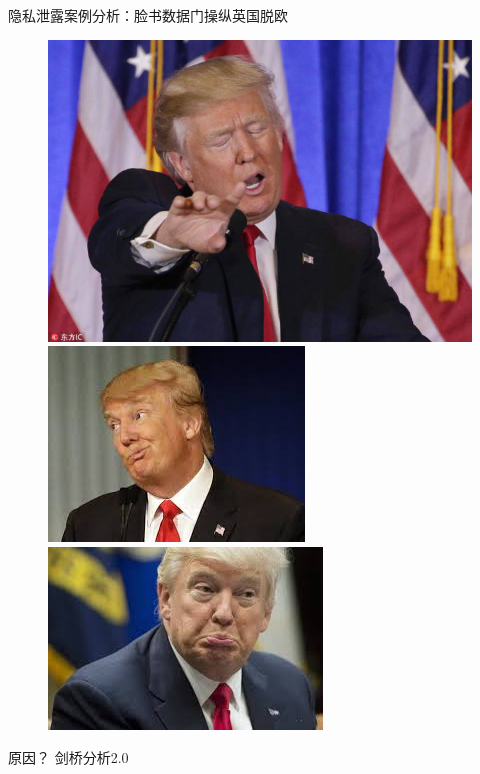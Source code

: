 \documentclass[11pt]{beamer}
\begin{document}
\begin{frame}[allowframebreaks]{隐私泄露案例分析：脸书数据门操纵英国脱欧}
\begin{figure}[htbp]
{\begin{minipage}[t]{0.33\linewidth}
			\centering
			\includegraphics[width=0.6\linewidth,height=0.2\textheight]{figures/privacy/trump/7}\\
			\vspace{0.02cm}
			\includegraphics[width=0.6\linewidth,height=0.2\textheight]{figures/privacy/trump/8}\\
			\vspace{0.02cm}
			\includegraphics[width=0.6\linewidth,height=0.2\textheight]{figures/privacy/trump/9}\\
			\vspace{0.02cm}
		\end{minipage}%
	}%
	\end{figure}
	\newpage
    原因？ 
    \newpage
    剑桥分析2.0

\end{frame}
\end{document}
